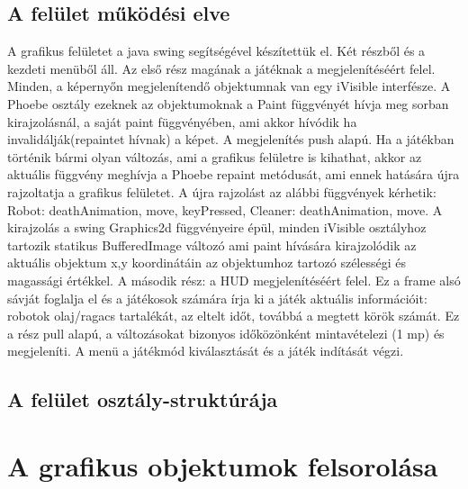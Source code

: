 \subsection{A felület működési elve}
A grafikus felületet a java swing segítségével készítettük el. Két részből és a kezdeti menüből áll.
Az első rész magának a játéknak a megjelenítéséért felel.
 Minden, a képernyőn megjelenítendő objektumnak van egy iVisible interfésze. A Phoebe osztály ezeknek az objektumoknak a Paint függvényét hívja meg sorban kirajzolásnál, a saját paint függvényében, ami akkor hívódik ha invalidálják(repaintet hívnak) a képet.
A megjelenítés push alapú. Ha a játékban történik bármi olyan változás, ami a grafikus felületre is kihathat, akkor az aktuális függvény meghívja a Phoebe repaint metódusát, ami ennek hatására újra rajzoltatja a grafikus felületet. A újra rajzolást az alábbi függvények kérhetik: Robot: deathAnimation, move, keyPressed, Cleaner: deathAnimation, move. A kirajzolás a swing Graphics2d függvényeire épül, minden iVisible osztályhoz tartozik statikus BufferedImage változó ami paint hívására kirajzolódik az aktuális objektum x,y koordinátáin  az objektumhoz tartozó szélességi és magassági értékkel. 
A második rész: a HUD megjelenítéséért felel. Ez a frame alsó sávját foglalja el és a játékosok számára írja ki a játék aktuális információit: robotok olaj/ragacs tartalékát, az eltelt időt, továbbá a megtett körök számát. Ez a rész pull alapú, a változásokat bizonyos időközönként mintavételezi (1 mp) és megjeleníti.  
A menü a játékmód kiválasztását és  a játék indítását végzi.  


\subsection{A felület osztály-struktúrája}

\section{A grafikus objektumok felsorolása}

